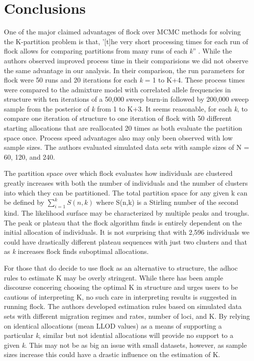 \section*{Conclusions}

One of the major claimed advantages of {\sc flock} over MCMC methods for solving the 
K-partition problem is that, '[t]he very short processing times for each run of {\sc flock} allows for
 comparing partitions from many runs of each \textit{k}'' \citep[][p.~735]{Duc&Tur2012}.
While the authors observed improved process time in their 
comparisions we did not observe the same advantage in our analysis. In their comparison, the 
run parameters for {\sc flock} were 50 runs and 20 iterations for each \textit{k} = 1 to K+4. 
These process times were compared to the admixture model with correlated allele 
frequencies in {\sc structure} with ten iterations of a 50,000 sweep burn-in followed 
by 200,000 sweep sample from the posterior of \textit{k} from 1 to K+3. 
It seems reasonable, for each \textit{k}, to compare one iteration of {\sc structure} 
to one iteration of {\sc flock} with 50 different starting allocations that are reallocated 20 times 
as both evaluate the partition space once. Process speed advantages also may only been observed 
with low sample sizes. The authors evaluated simulated data sets with sample sizes of N = 60, 120, 
and 240. 

The partition space over which {\sc flock} evaluates how individuals are clustered 
greatly increases with both the number of individuals and the number of clusters into 
which they can be partitioned. The total partition space for any given k can be 
defined by $\sum\limits_{i=1}^k S(n,k)$ where S(n,k) is a Stirling number of the 
second kind. The likelihood surface may be characterized by multiple peaks and troughs.
The peak or plateau that the  {\sc flock} algorithm finds is entirely dependent on the initial allocation of 
individuals. It is not surprising that with 2,596 individuals we could have 
drastically different plateau sequences with just two clusters and that as \textit{k} increases
{\sc flock} finds suboptimal allocations. 

For those that do decide to use {\sc flock} as an alternative to {\sc structure}, the adhoc rules 
to estimate K may be overly stringent. While there has been ample 
discourse concering choosing the optimal K in  {\sc structure} \citep{Evannoetal2005, 
Pritchardetal2000, Wap&Gag2006} and \citet{Pritchardetal2000} urges users 
to be cautious of interpreting K, no such care in interpreting results 
is suggested in running {\sc flock}. The authors developed estimation rules based on simulated data 
sets with different migration regimes and rates, number of loci, and K. 
By relying on identical allocations (mean LLOD values) as a means of supporting 
a particular \textit{k},  similar but not idential 
allocations will provide no support to a given \textit{k}. This may not be as big an issue with small datasets,
however, as sample sizes increase this could have a drastic influence on the estimation of 
K. 



 
